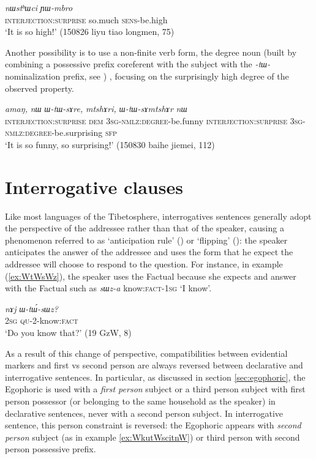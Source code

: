 \documentclass[oldfontcommands,oneside,a4paper,11pt]{article}
\newcommand{\ipa}[1]{{\phon\textit{#1}}} %
\newcommand{\refb}[1]{(\ref{#1})}
\begin{document}
\begin{exe}
\ex \label{ex:amang.YWmbro}
 \gll \ipa{amaŋ,}	\ipa{nɯstʰɯci}	\ipa{ɲɯ-mbro} \\
 \textsc{interjection:surprise} so.much \textsc{sens}-be.high \\
 \glt `It is so high!' (150826 liyu tiao longmen, 75)
\end{exe}

Another possibility is to use a non-finite verb form, the degree noun (built by combining a possessive prefix coreferent with the subject with the \ipa{-tɯ-} nominalization prefix, see \citealt[10-11]{jacques16comparative}) , focusing on the surprisingly high degree of the observed property.

\begin{exe}
\ex \label{ex:amang.WtWsAre}
 \gll 
\ipa{amaŋ,}	\ipa{nɯ}	\ipa{ɯ-tɯ-sɤre,}	\ipa{mtshɤri,}	\ipa{ɯ-tɯ-sɤmtshɤr}	\ipa{nɯ}	\\
 \textsc{interjection:surprise} \textsc{dem} \textsc{3sg-nmlz:degree}-be.funny  \textsc{interjection:surprise} \textsc{3sg-nmlz:degree}-be.surprising \textsc{sfp} \\
 \glt `It is so funny, so surprising!' (150830 baihe jiemei, 112)
\end{exe}
\section{Interrogative clauses}
Like most languages of the Tibetosphere, interrogatives sentences generally adopt the perspective of the addressee rather than that of the speaker, causing a phenomenon referred to as `anticipation rule' (\citealt[244]{tournadre14evidentiality}) or `flipping' (\citealt{sanroque17interrogativity}):   the speaker anticipates the answer of the addressee and uses the form that he expect the addressee will choose to respond to the question. For instance, in example \refb{ex:WtWsWz}, the speaker uses the Factual because she expects and answer with the Factual such as \ipa{sɯz-a} know:\textsc{fact}-\textsc{1sg} `I know'.

\begin{exe}
\ex \label{ex:WtWsWz}
\gll 
\ipa{nɤj}	\ipa{ɯ-tɯ́-sɯz?} \\
\textsc{2sg} \textsc{qu}-2-know:\textsc{fact} \\
\glt `Do you know that?' (19 GzW, 8)
\end{exe}

As a result of this change of perspective, compatibilities between evidential markers and first vs second person are always reversed between declarative and interrogative sentences. In particular, as discussed in section \ref{sec:egophoric}, the Egophoric is used with a \textit{first person} subject or a third person subject with first person possessor (or belonging to the same household as the speaker) in declarative sentences, never with a second person subject. In interrogative sentence, this person constraint is reversed: the Egophoric appears with \textit{second person} subject (as in example \ref{ex:WkutWscitnW}) or third person with second person possessive prefix. 
\end{document}
